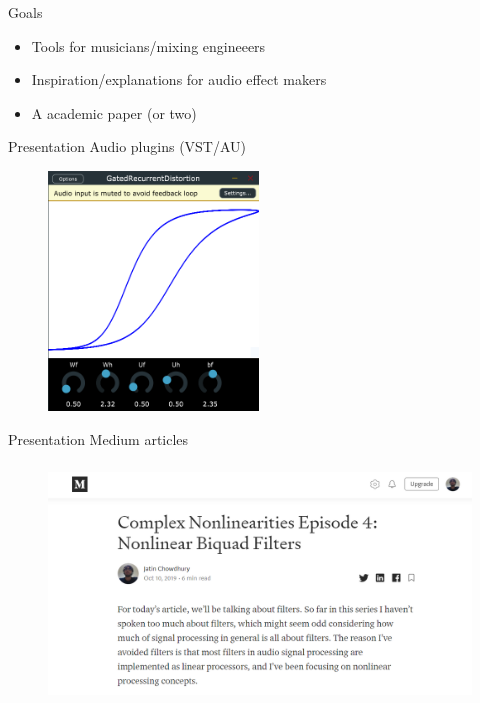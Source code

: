 \begin{frame}
\end{frame}

\begin{frame}{Goals}
    \begin{itemize}
        \item Tools for musicians/mixing engineeers
        \item Inspiration/explanations for audio effect makers
        \item A academic paper (or two)
    \end{itemize}
\end{frame}

\begin{frame}{Presentation}
    Audio plugins (VST/AU)
    \vspace{1ex}
    \begin{figure}
        \centering
        \includegraphics[height=2.5in]{Figures/GRU_screenshot}
    \end{figure}
\end{frame}

\begin{frame}{Presentation}
    Medium articles
    \vspace{1ex}
    \begin{figure}
        \centering
        \includegraphics[height=2.5in]{Figures/medium}
    \end{figure}
\end{frame}

